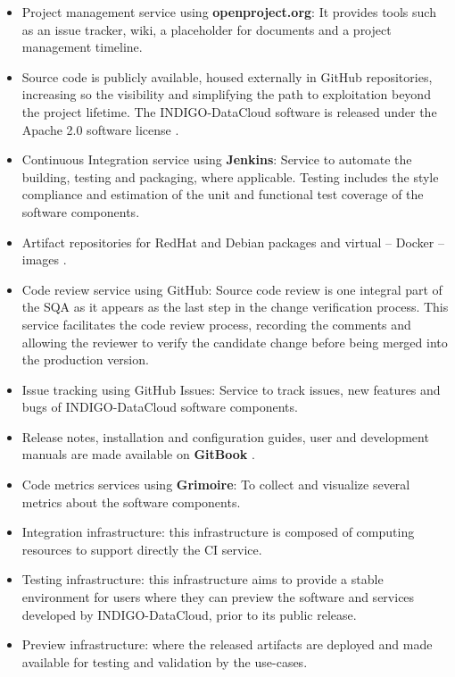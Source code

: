\documentclass{article}
\begin{document}
\begin{itemize}
    \item Project management service using {\bf openproject.org}: It provides
        tools such as an issue tracker, wiki, a placeholder for documents and a
        project management timeline.

    \item Source code is publicly available, housed externally
        in GitHub repositories, increasing so the visibility and simplifying the path to exploitation beyond the project lifetime. The INDIGO-DataCloud software is released under the Apache 2.0 software license \cite{apache-license}.

    \item Continuous Integration service using {\bf Jenkins}: Service to
        automate the building, testing and packaging, where
        applicable. Testing includes the style compliance and
        estimation of the unit and functional
        test coverage of the software components.

    \item Artifact repositories for RedHat and Debian
        packages \cite{indigo-package-repo} and virtual -- Docker -- images
        \cite{indigo-dockerhub}.

    \item Code review service using GitHub: Source code
        review is one integral part of the SQA
        as it appears as the last step in the change
        verification process. This service facilitates the code review
        process, recording the comments and
        allowing the reviewer to verify the candidate change before
        being merged into the production version.

    \item Issue tracking
        using GitHub Issues: Service to track issues, new features and bugs of
        INDIGO-DataCloud software components.

    \item Release notes, installation and configuration guides, user and
        development manuals are made available on {\bf GitBook}
        \cite{indigo-gitbook}.

    \item Code metrics services using {\bf Grimoire}: To collect and visualize
        several metrics about the software components.

    \item Integration infrastructure: this infrastructure is composed of
        computing resources to support directly the CI service.

    \item Testing infrastructure: this infrastructure aims to provide
        a stable
        environment for users where they can preview the software and services
        developed by INDIGO-DataCloud, prior to its public release.

    \item Preview infrastructure: where the released artifacts are deployed and
        made available for testing and validation by the use-cases.
\end{itemize}
\end{document}
